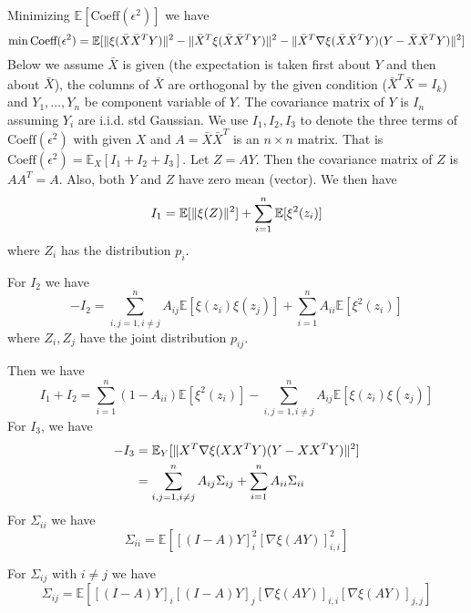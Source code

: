 \documentclass{article}
\DeclarePairedDelimiter\norm{\lVert}{\rVert}
\def\E{\mathbb{E}}
\begin{document}
Minimizing $\E[\textrm{Coeff}(\epsilon^2)]$ we have
\begin{equation}
\min \textrm{Coeff}(\epsilon^2) = \E[\norm{\xi(\bar{X}\bar{X}^TY)}^2 - \norm{\bar{X}^T\xi(\bar{X}\bar{X}^TY)}^2 - \norm{\bar{X}^T \nabla\xi(\bar{X}\bar{X}^TY)(Y-\bar{X}\bar{X}^TY)}^2]
\end{equation}
Below we assume $\bar{X}$ is given (the expectation is taken first about $Y$ and then about $\bar{X}$), the columns of $\bar{X}$ are orthogonal by the given condition ($\bar{X}^T\bar{X}=I_k$) and $Y_1, \dots, Y_n $ be component variable of $Y$. The covariance matrix of $Y$ is $I_n$ assuming $Y_i$ are i.i.d. std Gaussian. We use $I_1, I_2, I_3$ to denote the three terms of $\textrm{Coeff}(\epsilon^2)$ with given $X$ and $A=\bar{X}\bar{X}^T$ is an $n\times n$ matrix. That is $ \textrm{Coeff}(\epsilon^2) = \E_{X} [I_1 + I_2 + I_3]$.
Let $Z = AY$. Then the covariance matrix of $Z$ is $AA^T = A$.
Also, both $Y$ and $Z$ have zero mean (vector). We then have
\begin{equation*}
I_1 =\E[\norm{\xi(Z)}^2] + \sum_{i=1}^n \E[\xi^2(z_i)]
\end{equation*}
where $Z_i$ has the distribution $p_i$.
 
For $I_2$
we have
\begin{equation*}
-I_2   = \sum_{i,j=1, i \neq j}^n A_{ij}\E[\xi(z_i)\xi(z_j)] + \sum_{i=1}^n A_{ii}  \E[\xi^2(z_i)]
\end{equation*}
where $Z_i, Z_j$ have the joint distribution $p_{ij}$.

Then we have
\begin{equation}\label{eq:I1plusI2}
I_1+ I_2 =   \sum_{i=1}^n (1-A_{ii}) \E[\xi^2(z_i)]  - \sum_{i,j=1, i \neq j}^n A_{ij}\E[\xi(z_i)\xi(z_j)] 
\end{equation}
For $I_3$, we have
\begin{align*}
-I_3 & = \E_Y[\norm{X^T \nabla\xi(XX^TY)(Y-XX^TY)}^2] \\ 
 & = \sum_{i,j=1, i \neq j}^n A_{ij}\Sigma_{ij} + \sum_{i=1}^n A_{ii}\Sigma_{ii} 
\end{align*}
For $\Sigma_{ii}$ we have
\begin{equation}\label{eq:sigmaii}
\Sigma_{ii} =  \E[ [(I-A)Y]_i^2 [\nabla \xi(AY)]_{i,i}^2]
\end{equation}

For $\Sigma_{ij}$ with $i\neq j$ we have
\begin{equation*}
\Sigma_{ij} =  \E[ [(I-A)Y]_i [(I-A)Y]_j [\nabla \xi(AY)]_{i,i} [\nabla \xi(AY)]_{j,j}]
\end{equation*}
\end{document}
